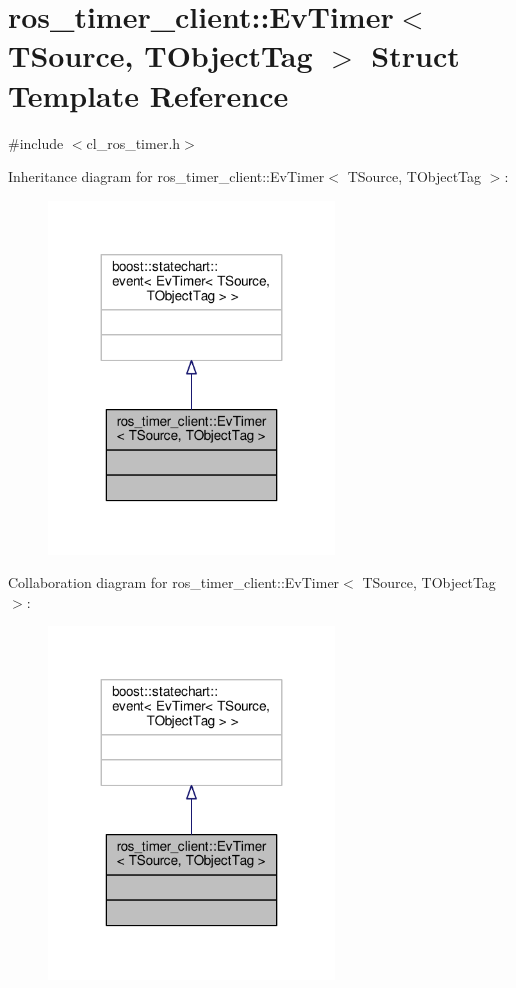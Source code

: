 \hypertarget{structros__timer__client_1_1EvTimer}{}\section{ros\+\_\+timer\+\_\+client\+:\+:Ev\+Timer$<$ T\+Source, T\+Object\+Tag $>$ Struct Template Reference}
\label{structros__timer__client_1_1EvTimer}


{\ttfamily \#include $<$cl\+\_\+ros\+\_\+timer.\+h$>$}



Inheritance diagram for ros\+\_\+timer\+\_\+client\+:\+:Ev\+Timer$<$ T\+Source, T\+Object\+Tag $>$\+:\nopagebreak
\begin{figure}[H]
\begin{center}
\leavevmode
\includegraphics[width=215pt]{structros__timer__client_1_1EvTimer__inherit__graph}
\end{center}
\end{figure}


Collaboration diagram for ros\+\_\+timer\+\_\+client\+:\+:Ev\+Timer$<$ T\+Source, T\+Object\+Tag $>$\+:\nopagebreak
\begin{figure}[H]
\begin{center}
\leavevmode
\includegraphics[width=215pt]{structros__timer__client_1_1EvTimer__coll__graph}
\end{center}
\end{figure}


